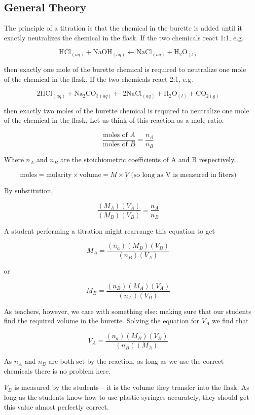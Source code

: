 \subsection{General Theory}

The principle of a titration is that the chemical in the burette is added until it exactly neutralizes the chemical in the flask. If the two chemicals react 1:1, e.g. 

\[ \mathrm{HCl}_{(aq)} + \mathrm{NaOH}_{(aq)} \longleftarrow \mathrm{NaCl}_{(aq)} + \mathrm{H}_{2}\mathrm{O}_{(l)} \]

then exactly one mole of the burette chemical is required to neutralize one mole of the chemical in the flask. If the two chemicals react 2:1, e.g. 

\[ 2\mathrm{HCl}_{(aq)} + \mathrm{Na}_{2}\mathrm{CO}_{3(aq)} \longleftarrow 2\mathrm{NaCl}_{(aq)} + \mathrm{H}_{2}\mathrm{O}_{(l)} + \mathrm{CO}_{2(g)} \]

then exactly two moles of the burette chemical is required to neutralize one mole of the chemical in the flask. Let us think of this reaction as a mole ratio.

\[ \frac{\mbox{moles of }A}{\mbox{moles of }B} = \frac{n_{A}}{n_{B}} \]

Where $ n_{A} $ and $ n_{B} $ are the stoichiometric coefficients of A and B respectively.

\[ \mathrm{moles} = \mathrm{molarity} \times \mathrm{volume} = M \times V \mbox{ (so long as V is measured in liters)} \]

By substitution,

\[ \frac{(M_{A})(V_{A})}{(M_{B})(V_{B})} = \frac{n_{A}}{n_{B}} \]

A student performing a titration might rearrange this equation to get

\[ M_{A} = \frac{(n_{a})(M_{B})(V_{B})}{(n_{B})(V_{A})} \]

or

\[ M_{B} = \frac{(n_{B})(M_{A})(V_{A})}{(n_{A})(V_{B})} \]

As teachers, however, we care with something else: making sure that our students find the required volume in the burette. Solving the equation for $ V_{A} $ we find that

\[ V_{A} = \frac{(n_{a})(M_{B})(V_{B})}{(n_{B})(M_{A})} \]

As $ n_{A} $ and $ n_{B} $ are both set by the reaction, as long as we use the correct chemicals there is no problem here.

$ V_{B} $ is measured by the students -- it is the volume they transfer into the flask. As long as the students know how to use plastic syringes accurately, they should get this value almost perfectly correct.

